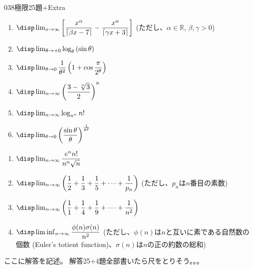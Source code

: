 \begin{thm}{038}{}{極限25題+Extra}
\begin{enumerate}
  \item $\disp \lim_{x\to\infty} \left[\dfrac{x^\alpha}{\left\lceil\beta x-7\right\rceil}-\dfrac{x^\alpha}{\left\lceil\gamma x+3\right\rceil}\right]$ (ただし、$\alpha\in\mathbb{R}$, $\beta, \gamma>0$)
  \item $\disp \lim_{\theta\to +0} \log_\theta \left(\sin\theta\right)$
  \item $\disp \lim_{\theta\to 0} \dfrac{1}{\theta^2}\left(1+\cos\dfrac{\pi}{2^\theta}\right)$
  \item $\disp \lim_{n\to\infty} \left(\dfrac{3-\sqrt[n]{3}}{2}\right)^n$
  \item $\disp \lim_{n\to\infty} \log_{n^n}n!$
  \item $\disp \lim_{\theta\to 0} \left(\dfrac{\sin\theta}{\theta}\right)^{\frac{1}{\theta^2}}$
 \end{enumerate}
 \begin{enumerate}
  \renewcommand{\labelenumi}{Ex\arabic{enumi}}
  \item $\disp \lim_{n\to\infty} \dfrac{e^nn!}{n^n\sqrt{n}}$
  \item $\disp \lim_{n\to\infty} \left(\dfrac{1}{2}+\dfrac{1}{3}+\dfrac{1}{5}+\cdots+\dfrac{1}{p_n}\right)$ (ただし、$p_n$は$n$番目の素数)
  \item $\disp \lim_{n\to\infty} \left(\dfrac{1}{1}+\dfrac{1}{4}+\dfrac{1}{9}+\cdots+\dfrac{1}{n^2}\right)$
  \item $\disp \liminf_{n\to\infty} \dfrac{\phi(n)\sigma(n)}{n^2}$ (ただし、$\phi(n)$は$n$と互いに素である自然数の個数 (Euler's totient function)、$\sigma(n)$は$n$の正の約数の総和)
 \end{enumerate}
\end{thm}

ここに解答を記述。
解答25+4題全部書いたら尺をとりそう。。。